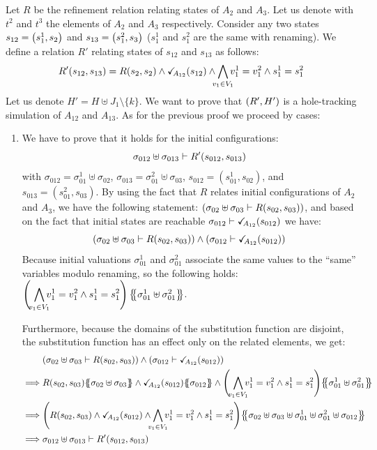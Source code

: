 \documentclass[runningheads]{llncs}
\begin{document}
Let $R$ be the refinement relation relating states of $A_2$ and $A_3$. 
Let us denote with $t^2$ and $t^3$  the elements of $A_2$ and $A_3$ respectively.
Consider any two states $s_{12} = {\left(s^1_1,s_2\right)}$ and $s_{13} = {\left(s^2_1,s_3\right)}$ ($s^1_1$ and $s^2_1$  are the same with renaming). We define a relation $R'$ relating states of $s_{12}$ and $s_{13}$ as follows:
\[ R' \mpar{s_{12}, s_{13}} = R\mpar{s_{2}, s_{2}} \wedge \reach{A_{12}}\mpar{s_{12}} \wedge \bigwedge_\subbox{v_1\in V_1}
 v^1_1=v^2_1\wedge s^1_1 = s^2_1\]
Let us denote $H'=H\uplus J_1 \setminus\{k\}$.
We want to prove that ${\left(R', H'\right)}$  is a hole-tracking simulation of $A_{12}$ and $A_{13}$. As for the previous proof we proceed by cases:
\begin{enumerate}
\item We have to prove that it holds for the initial configurations:
\[\sigma_{012} \uplus \sigma_{013} \vdash R'{\left(s_{012}, s_{013}\right)}\]
with $\sigma_{012} = \sigma_{01}^1 \uplus \sigma_{02}$, $\sigma_{013} = \sigma_{01}^2 \uplus \sigma_{03}$, $s_{012}=(s_{01}^1,s_{02})$, and $s_{013}=(s_{01}^2,s_{03})$.
By using the fact that $R$ relates initial configurations of  $A_2$ and $A_3$, we have  the following statement:
${\left(\sigma_{02} \uplus \sigma_{03} \vdash R{\left(s_{02}, s_{03}\right)}\right)}$,  and based on the  fact that initial states are reachable $\sigma_{012} \vdash \checkmark_{\!\! A_{12}}{\left(s_{012}\right)}$ we have:
\[ {\left(\sigma_{02} \uplus \sigma_{03} \vdash R{\left(s_{02}, s_{03}\right)}\right)} \wedge 
{\left(\sigma_{012} \vdash \checkmark_{\!\! A_{12}}{\left(s_{012}\right)}\right)}\]
Because initial valuations $\sigma_{01}^1$ and $\sigma_{01}^2$ associate the same values to the ``same'' variables modulo renaming, so the following holds:\\ $\left(\,\,{\displaystyle \bigwedge_\subbox{v_1\in V_1} v^1_1=v^2_1\wedge s^1_1 = s^2_1}\right)\psubst{\sigma_{01}^1 \uplus \sigma_{01}^2 }$.

Furthermore, because  the domains of the substitution function are disjoint, the substitution function has an effect only on the related elements,  we get:
\begin{align*}
& \mpar{\sigma_{02} \uplus \sigma_{03} \vdash R\mpar{s_{02}, s_{03}}} \wedge 
\mpar{\sigma_{012} \vdash \reach{A_{12}}\mpar{s_{012}}}\\
\implies & R\mpar{s_{02}, s_{03}}\psubst{ \sigma_{02} \uplus \sigma_{03}} \wedge \reach{A_{12}}\mpar{s_{012}} \psubst{\sigma_{012}} \land \mpar{\,\, {\displaystyle \bigwedge_\subbox{v_1\in V_1} v^1_1=v^2_1\wedge s^1_1 = s^2_1}}\psubst{\sigma_{01}^1 \uplus \sigma_{01}^2 }\\
\implies & \mpar{R\mpar{s_{02}, s_{03}} \wedge \reach{A_{12}}\mpar{s_{012}}  \wedge \bigwedge_\subbox{v_1\in V_1}  v^1_1=v^2_1\wedge s^1_1 = s^2_1} \psubst{ \sigma_{02} \uplus \sigma_{03} \uplus \sigma^1_{01}\uplus \sigma^2_{01} \uplus \sigma_{012}}\\
\implies & \sigma_{012} \uplus \sigma_{013} \vdash R'\mpar{s_{012}, s_{013}}
\end{align*}


\end{enumerate}
\end{document}
